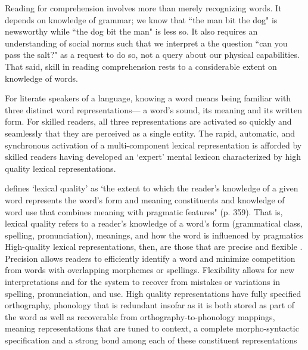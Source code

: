 \documentclass[review]{elsarticle}
\begin{document}


Reading for comprehension involves more than merely recognizing words. It depends on knowledge of grammar; we know that ``the man bit the dog" is newsworthy while ``the dog bit the man" is less so.  It also requires an understanding of social norms such that we interpret a the question ``can you pass the salt?" as a request to do so, not a query about our physical capabilities.  That said, skill in reading comprehension rests to a considerable extent on knowledge of words.

For literate speakers of a language, knowing a word means being familiar with three distinct word representations— a word's sound, its meaning and its written form. For skilled readers,  all three representations are activated so quickly and seamlessly that they are perceived as a single entity. The rapid, automatic, and synchronous activation of a multi-component lexical representation is afforded by skilled readers having developed an `expert' mental lexicon characterized by high quality lexical representations.

\citet{perfettiReadingAbilityLexical2007} defines `lexical quality'  as `the extent to which the reader's knowledge of a given word represents the word's form and meaning constituents and knowledge of word use that combines meaning with pragmatic features" (p. 359). That is, lexical quality refers to a reader's knowledge of a word's form (grammatical class, spelling, pronunciation), meanings, and how the word is influenced by pragmatics
High-quality lexical representations, then, are those that are precise and flexible \citep{perfettiReadingAbilityLexical2007}.  Precision allows readers to efficiently identify a word and minimize competition from words with overlapping morphemes or spellings. Flexibility allows for new interpretations and for the system to recover from mistakes or variations in spelling, pronunciation, and use. High quality representations have fully specified orthography, phonology that is redundant insofar as it is both stored as part of the word  as well as recoverable from orthography-to-phonology mappings, meaning representations that are tuned to context, a complete morpho-syntactic specification and a strong bond among each of these constituent representations \citep{perfettiLexicalQualityHypothesis2002, perfettiReadingAbilityLexical2007, perfettiLexicalQualityRevisited2017} %
  
\end{document}
